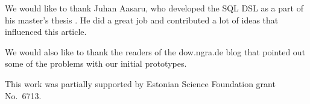 \documentclass{sig-alternate}
\begin{document}
We would like to thank Juhan Aasaru, who developed the SQL DSL as a part of his master's thesis \cite{aasaru2008}. He did a great job and contributed a lot of ideas that influenced this article. 

We would also like to thank the readers of the dow.ngra.de blog that pointed out some of the problems with our initial prototypes.

This work was partially supported by Estonian Science Foundation grant No.\ 6713.



\end{document}
